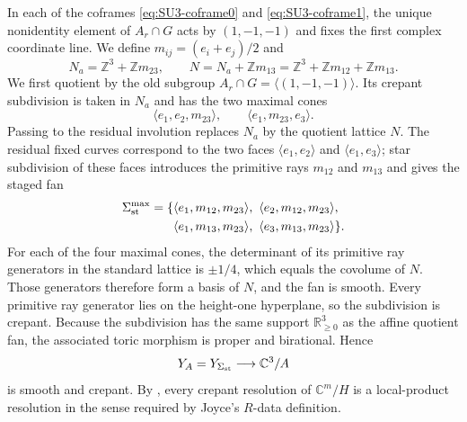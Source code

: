 \documentclass[11pt]{article}
\theoremstyle{remark}\newtheorem{remark}[theorem]{Remark}
\newcommand{\R}{\mathbb R}
\newcommand{\C}{\mathbb C}
\newcommand{\Z}{\mathbb Z}
\begin{document}
In each of the coframes \eqref{eq:SU3-coframe0} and
\eqref{eq:SU3-coframe1}, the unique nonidentity element of $A_r\cap G$
acts by $(1,-1,-1)$ and fixes the first complex coordinate line.  We define
$m_{ij}=(e_i+e_j)/2$ and
\begin{equation}\label{eq:toric-lattices}
N_a=\Z^3+\Z m_{23},\qquad
N=N_a+\Z m_{13}
  =\Z^3+\Z m_{12}+\Z m_{13}.
\end{equation}
We first quotient by the old subgroup
$A_r\cap G=\langle(1,-1,-1)\rangle$.  Its crepant subdivision is taken in
$N_a$ and has the two maximal cones
\[
\langle e_1,e_2,m_{23}\rangle,\qquad
\langle e_1,m_{23},e_3\rangle.
\]
Passing to the residual involution replaces $N_a$ by the quotient lattice
$N$.  The residual fixed curves correspond to the two faces
$\langle e_1,e_2\rangle$ and $\langle e_1,e_3\rangle$; star subdivision of
these faces introduces the primitive rays $m_{12}$ and $m_{13}$ and gives
the staged fan
\begin{equation}\label{eq:toric-cones}
\begin{split}
\Sigma_{\rm st}^{\max}=\{&
\langle e_1,m_{12},m_{23}\rangle,\
\langle e_2,m_{12},m_{23}\rangle,\\
&\langle e_1,m_{13},m_{23}\rangle,\
\langle e_3,m_{13},m_{23}\rangle\}.
\end{split}
\end{equation}
For each of the four maximal cones, the determinant of its primitive ray
generators in the standard lattice is $\pm1/4$, which equals the covolume
of $N$.  Those generators therefore form a basis of $N$, and the fan is
smooth.  Every primitive ray generator lies on the height-one hyperplane,
so the subdivision is crepant.  Because the subdivision has the same
support $\R_{\geq0}^3$ as the affine quotient fan, the associated toric
morphism is proper and birational.  Hence
\begin{equation}\label{eq:Y-A}
Y_A=Y_{\Sigma_{\rm st}}\longrightarrow\C^3/A
\end{equation}
is smooth and crepant.  By \cite[Proposition 9.1.4]{JoyceBook}, every
crepant resolution of $\C^m/H$ is a local-product resolution in the sense
required by Joyce's $R$-data definition.
\end{document}
